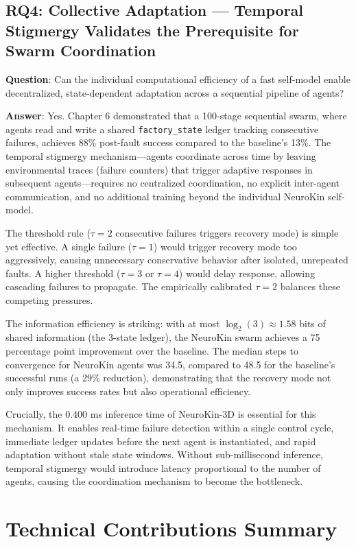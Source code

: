 \documentclass[12pt,a4paper,oneside]{report}
\begin{document}
\subsection{RQ4: Collective Adaptation --- Temporal Stigmergy Validates the Prerequisite for Swarm Coordination}

\textbf{Question}: Can the individual computational efficiency of a fast self-model enable decentralized, state-dependent adaptation across a sequential pipeline of agents?

\textbf{Answer}: Yes. Chapter 6 demonstrated that a 100-stage sequential swarm, where agents read and write a shared \texttt{factory\_state} ledger tracking consecutive failures, achieves 88\% post-fault success compared to the baseline's 13\%. The temporal stigmergy mechanism---agents coordinate across time by leaving environmental traces (failure counters) that trigger adaptive responses in subsequent agents---requires no centralized coordination, no explicit inter-agent communication, and no additional training beyond the individual NeuroKin self-model.

The threshold rule ($\tau = 2$ consecutive failures triggers recovery mode) is simple yet effective. A single failure ($\tau = 1$) would trigger recovery mode too aggressively, causing unnecessary conservative behavior after isolated, unrepeated faults. A higher threshold ($\tau = 3$ or $\tau = 4$) would delay response, allowing cascading failures to propagate. The empirically calibrated $\tau = 2$ balances these competing pressures.

The information efficiency is striking: with at most $\log_2(3) \approx 1.58$ bits of shared information (the 3-state ledger), the NeuroKin swarm achieves a 75 percentage point improvement over the baseline. The median steps to convergence for NeuroKin agents was 34.5, compared to 48.5 for the baseline's successful runs (a 29\% reduction), demonstrating that the recovery mode not only improves success rates but also operational efficiency.

Crucially, the 0.400 ms inference time of NeuroKin-3D is essential for this mechanism. It enables real-time failure detection within a single control cycle, immediate ledger updates before the next agent is instantiated, and rapid adaptation without stale state windows. Without sub-millisecond inference, temporal stigmergy would introduce latency proportional to the number of agents, causing the coordination mechanism to become the bottleneck.

\section{Technical Contributions Summary}
\end{document}
